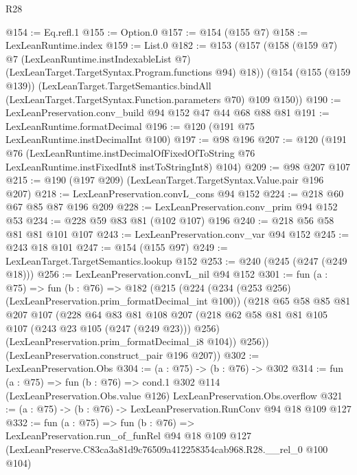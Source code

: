 \begin{lexlean}{R28}
\begin{coremodule}
@154 := Eq.refl.{1}
@155 := Option.{0}
@157 := @154 (@155 @7)
@158 := LexLeanRuntime.index
@159 := List.{0}
@182 := @153
    (@157
      (@158
        (@159 @7)
        @7
        (LexLeanRuntime.instIndexableList @7)
        (LexLeanTarget.TargetSyntax.Program.functions @94)
        @18))
    (@154
      (@155 (@159 @139))
      (LexLeanTarget.TargetSemantics.bindAll
        (LexLeanTarget.TargetSyntax.Function.parameters @70)
        @109
        @150))
@190 := LexLeanPreservation.conv_build @94 @152 @47 @44 @68 @88 @81
@191 := LexLeanRuntime.formatDecimal
@196 := @120 (@191 @75 LexLeanRuntime.instDecimalInt @100)
@197 := @98 @196
@207 := @120
    (@191
      @76
      (LexLeanRuntime.instDecimalOfFixedOfToString
        @76
        LexLeanRuntime.instFixedInt8
        instToStringInt8)
      @104)
@209 := @98 @207 @107
@215 := @190 (@197 @209) (LexLeanTarget.TargetSyntax.Value.pair @196 @207)
@218 := LexLeanPreservation.convL_cons @94 @152
@224 := @218 @60 @67 @85 @87 @196 @209
@228 := LexLeanPreservation.conv_prim @94 @152 @53
@234 := @228 @59 @83 @81 (@102 @107) @196
@240 := @218 @56 @58 @81 @81 @101 @107
@243 := LexLeanPreservation.conv_var @94 @152
@245 := @243 @18 @101
@247 := @154 (@155 @97)
@249 := LexLeanTarget.TargetSemantics.lookup @152
@253 := @240 (@245 (@247 (@249 @18)))
@256 := LexLeanPreservation.convL_nil @94 @152
@301 := fun (a : @75) =>
  fun (b : @76) =>
  @182
    (@215
      (@224
        (@234 (@253 @256) (LexLeanPreservation.prim_formatDecimal_int @100))
        (@218
          @65
          @58
          @85
          @81
          @207
          @107
          (@228
            @64
            @83
            @81
            @108
            @207
            (@218 @62 @58 @81 @81 @105 @107 (@243 @23 @105 (@247 (@249 @23))) @256)
            (LexLeanPreservation.prim_formatDecimal_i8 @104))
          @256))
      (LexLeanPreservation.construct_pair @196 @207))
@302 := LexLeanPreservation.Obs
@304 := (a : @75) -> (b : @76) -> @302
@314 := fun (a : @75) =>
  fun (b : @76) =>
  cond.{1} @302 @114 (LexLeanPreservation.Obs.value @126) LexLeanPreservation.Obs.overflow
@321 := (a : @75) -> (b : @76) -> LexLeanPreservation.RunConv @94 @18 @109 @127
@332 := fun (a : @75) =>
  fun (b : @76) =>
  LexLeanPreservation.run_of_funRel
    @94
    @18
    @109
    @127
    (LexLeanPreserve.C83ca3a81d9c76509a412258354cab968.R28.__rel_0 @100 @104)
\end{coremodule}
\end{lexlean}
